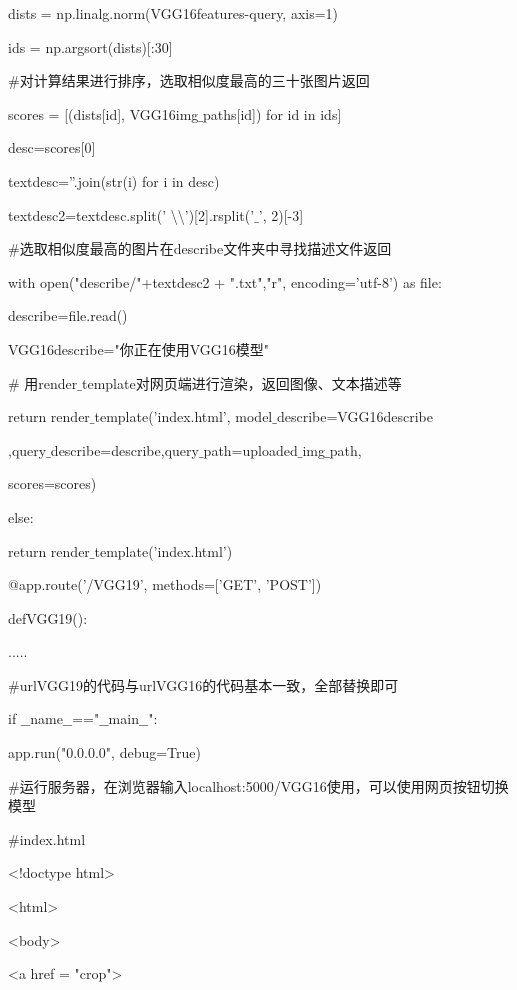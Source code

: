 \documentclass[bachelor_p]{hdu-thesis}
\begin{document}
\qquad \qquad dists = np.linalg.norm(VGG16features-query, axis=1)  

\qquad \qquad ids = np.argsort(dists)[:30]

\qquad \qquad $\#$对计算结果进行排序，选取相似度最高的三十张图片返回

\qquad \qquad scores = [(dists[id], VGG16img$\_$paths[id]) for id in ids]
        
\qquad \qquad desc=scores[0]

\qquad \qquad textdesc=''.join(str(i) for i in desc)

\qquad \qquad textdesc2=textdesc.split(' \textbackslash  \textbackslash ')[2].rsplit('$\_$', 2)[-3]

\qquad \qquad $\#$选取相似度最高的图片在describe文件夹中寻找描述文件返回

\qquad \qquad with open("describe/"+textdesc2 + ".txt","r", encoding='utf-8') as file:

\qquad \qquad \qquad describe=file.read()
        
\qquad \qquad VGG16describe="你正在使用VGG16模型"

\qquad \qquad $\#$ 用render$\_$template对网页端进行渲染，返回图像、文本描述等
        
\qquad \qquad return render$\_$template('index.html', model$\_$describe=VGG16describe

\qquad \qquad ,query$\_$describe=describe,query$\_$path=uploaded$\_$img$\_$path,

\qquad \qquad scores=scores)

\qquad else:

\qquad \qquad return render$\_$template('index.html')

@app.route('/VGG19', methods=['GET', 'POST'])

def\quad VGG19():

\qquad .....

\qquad $\#$urlVGG19的代码与urlVGG16的代码基本一致，全部替换即可


if $\_$$\_$name$\_$$\_$=="$\_$$\_$main$\_$$\_$":

\qquad app.run("0.0.0.0", debug=True)

\qquad $\#$运行服务器，在浏览器输入localhost:5000/VGG16使用，可以使用网页按钮切换模型

$\#$index.html


<!doctype html>

<html>

<body>

<a href = "crop">
\end{document}
